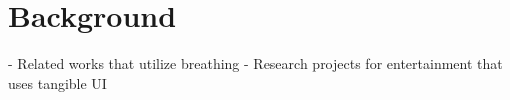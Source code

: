 \section{Background}\label{sec:background}

\TODO
- Related works that utilize breathing \newline
- Research projects for entertainment that uses tangible UI
